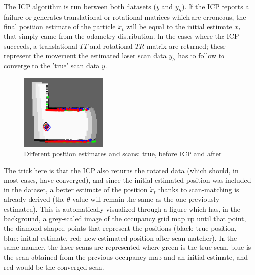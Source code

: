 The ICP algorithm is run between both datasets ($y$ and $y_h$). If the ICP reports a failure or generates translational or rotational matrices which are erroneous, the final position estimate of the particle $\ddot x_t$ will be equal to the initial estimate $x_t$ that simply came from the odometry distribution. In the cases where the ICP succeeds, a translational $TT$ and rotational $TR$ matrix are returned; these represent the movement the estimated laser scan data $y_h$ has to follow to converge to the 'true' scan data $y$. 

\begin{figure}
	\renewcommand\figurename{Fig.}
	\begin{center}
		\includegraphics[width=0.38\textwidth]{figures/path-image}
	\end{center}
	\caption{Different position estimates and scans: true, before ICP and after}
\end{figure}

The trick here is that the ICP also returns the rotated data (which should, in most cases, have converged), and since the initial estimated position was included in the dataset, a better estimate of the position $\dot x_t$ thanks to scan-matching is already derived (the $\theta$ value will remain the same as the one previously estimated). This is automatically visualized through a figure which has, in the background, a grey-scaled image of the occupancy grid map up until that point, the diamond shaped points that represent the positions (black: true position, blue: initial estimate, red: new estimated position after scan-matcher). In the same manner, the laser scans are represented where green is the true scan, blue is the scan obtained from the previous occupancy map and an initial estimate, and red would be the converged scan.

